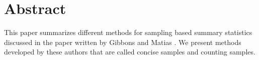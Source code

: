 
\section{Abstract}

This paper summarizes different methods for sampling based summary
statistics discussed in the paper written by Gibbons and Matias
\cite{GM98}. We present methods developed by these authors that are called
concise samples and counting samples.

